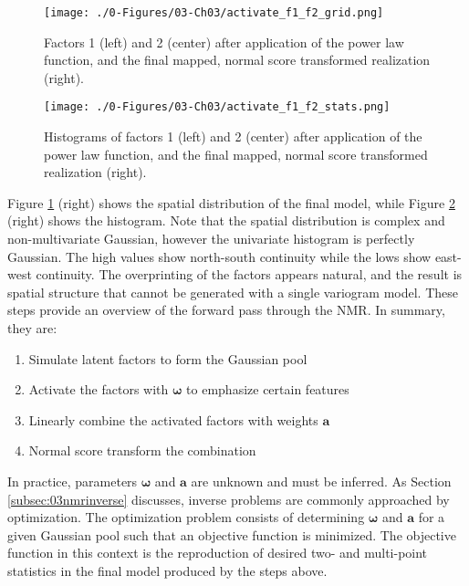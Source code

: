 \begin{figure}[htb!]
    \centering
    \texttt{[image: ./0-Figures/03-Ch03/activate\_f1\_f2\_grid.png]}
    \caption{Factors 1 (left) and 2 (center) after application of the power law function, and the final mapped, normal score transformed realization (right).}
    \label{fig:activate_f1_f2_grid}
\end{figure}

\begin{figure}[htb!]
    \centering
    \texttt{[image: ./0-Figures/03-Ch03/activate\_f1\_f2\_stats.png]}
    \caption{Histograms of factors 1 (left) and 2 (center) after application of the power law function, and the final mapped, normal score transformed realization (right).}
    \label{fig:activate_f1_f2_stats}
\end{figure}

Figure \ref{fig:activate_f1_f2_grid} (right) shows the spatial distribution of the final model, while Figure \ref{fig:activate_f1_f2_stats} (right) shows the histogram. Note that the spatial distribution is complex and non-multivariate Gaussian, however the univariate histogram is perfectly Gaussian. The high values show north-south continuity while the lows show east-west continuity. The overprinting of the factors appears natural, and the result is spatial structure that cannot be generated with a single variogram model. These steps provide an overview of the forward pass through the \gls{NMR}. In summary, they are:
\begin{enumerate}[noitemsep]
    \item Simulate latent factors to form the Gaussian pool
    \item Activate the factors with $\boldsymbol{\omega}$ to emphasize certain features
    \item Linearly combine the activated factors with weights $\mathbf{a}$
    \item Normal score transform the combination
\end{enumerate}

In practice, parameters $\boldsymbol{\omega}$ and $\mathbf{a}$ are unknown and must be inferred. As Section \ref{subsec:03nmrinverse} discusses, inverse problems are commonly approached by optimization. The optimization problem consists of determining $\boldsymbol{\omega}$ and $\mathbf{a}$ for a given Gaussian pool such that an objective function is minimized. The objective function in this context is the reproduction of desired two- and multi-point statistics in the final model produced by the steps above.

